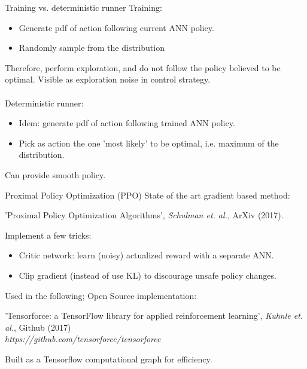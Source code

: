 \documentclass{beamer}
\begin{document}
\begin{frame}{Training vs. deterministic runner}
    Training:
    
    \begin{itemize}
        \item Generate pdf of action following current ANN policy.
        \item Randomly sample from the distribution
    \end{itemize}
    
    Therefore, perform exploration, and do not follow the policy believed to be optimal. Visible as exploration
    noise in control strategy. \\~\\
    
    Deterministic runner:
    
    \begin{itemize}
        \item Idem: generate pdf of action following trained ANN policy.
        \item Pick as action the one 'most likely' to be optimal, i.e. maximum of the distribution.
    \end{itemize}
    
    Can provide smooth policy.
\end{frame}


\begin{frame}{Proximal Policy Optimization (PPO)}
     State of the art gradient based method:
    
    \begin{center}
      'Proximal Policy Optimization Algorithms', \textit{Schulman et. al.}, ArXiv (2017). \\
    \end{center}

    Implement a few tricks:

    \begin{itemize}
        \item Critic network: learn (noisy) actualized reward with a separate ANN.
        \item Clip gradient (instead of use KL) to discourage unsafe policy changes.    
    \end{itemize}
    
    Used in the following; Open Source implementation:
    
    \begin{center}
      'Tensorforce: a TensorFlow library for applied reinforcement learning', \textit{Kuhnle et. al.}, Github (2017) \\
      \textit{https://github.com/tensorforce/tensorforce}
    \end{center}
    
    Built as a Tensorflow computational graph for efficiency.
\end{frame}
\end{document}
